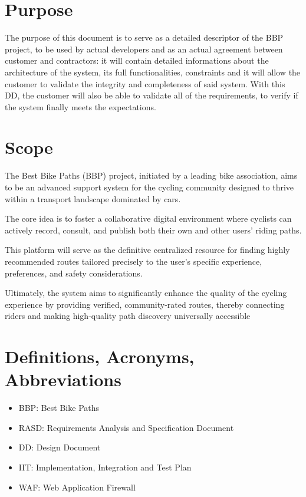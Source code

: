 \section{Purpose}
The purpose of this document is to serve as a detailed descriptor of the BBP project, to be used by actual developers and as an actual agreement between customer and contractors: it will contain detailed informations about the architecture of the system, its full functionalities, constraints and it will allow the customer to validate the integrity and completeness of said system. With this DD, the customer will also be able to validate all of the requirements, to verify if the system finally meets the expectations.

\section{Scope}
The Best Bike Paths (BBP) project, initiated by a leading bike association,
aims to be an advanced support system for the cycling community designed
to thrive within a transport landscape dominated by cars.

The core idea is to foster
a collaborative digital environment where cyclists can actively record, consult,
and publish both their own and other users' riding paths.

This platform will serve as the definitive centralized resource for finding highly recommended routes tailored
precisely to the user's specific experience, preferences, and safety considerations.

Ultimately, the system aims to significantly enhance the quality of the cycling experience
by providing verified, community-rated routes, thereby connecting riders and making
high-quality path discovery universally accessible

\section{Definitions, Acronyms, Abbreviations}
\begin{itemize}
	\item BBP: Best Bike Paths
	\item RASD: Requirements Analysis and Specification Document
	\item DD: Design Document
	\item IIT: Implementation, Integration and Test Plan
	\item WAF: Web Application Firewall
\end{itemize}

